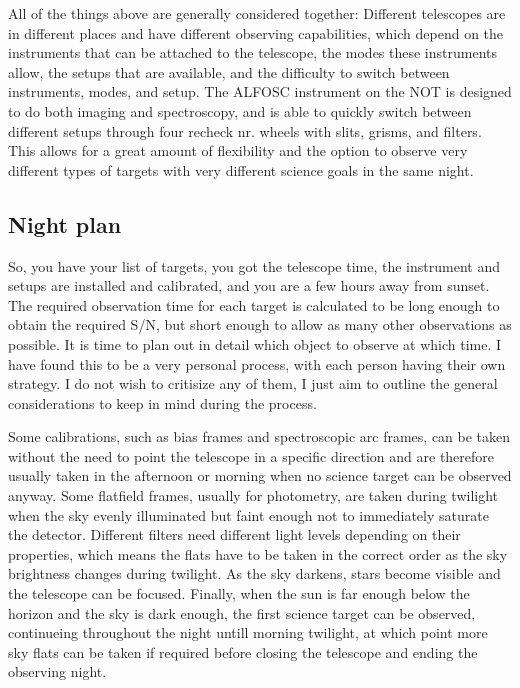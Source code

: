 \documentclass[a4paper,oneside,12pt, class=Latex/Classes/PhDthesisPSnPDF, crop=false]{standalone}
\begin{document}
All of the things above are generally considered together: Different telescopes are in different places and have different observing capabilities, which depend on the instruments that can be attached to the telescope, the modes these instruments allow, the setups that are available, and the difficulty to switch between instruments, modes, and setup. The ALFOSC instrument on the NOT is designed to do both imaging and spectroscopy, and is able to quickly switch between different setups through four \color{red} recheck nr. \color{black} wheels with slits, grisms, and filters. This allows for a great amount of flexibility and the option to observe very different types of targets with very different science goals in the same night.


\subsection{Night plan}
So, you have your list of targets, you got the telescope time, the instrument and setups are installed and calibrated, and you are a few hours away from sunset. The required observation time for each target is calculated to be long enough to obtain the required S/N, but short enough to allow as many other observations as possible. It is time to plan out in detail which object to observe at which time. I have found this to be a very personal process, with each person having their own strategy. I do not wish to critisize any of them, I just aim to outline the general considerations to keep in mind during the process.

Some calibrations, such as bias frames and spectroscopic arc frames, can be taken without the need to point the telescope in a specific direction and are therefore usually taken in the afternoon or morning when no science target can be observed anyway. Some flatfield frames, usually for photometry, are taken during twilight when the sky evenly illuminated but faint enough not to immediately saturate the detector. Different filters need different light levels depending on their properties, which means the flats have to be taken in the correct order as the sky brightness changes during twilight. As the sky darkens, stars become visible and the telescope can be focused. Finally, when the sun is far enough below the horizon and the sky is dark enough, the first science target can be observed, continueing throughout the night untill morning twilight, at which point more sky flats can be taken if required before closing the telescope and ending the observing night.
\end{document}
